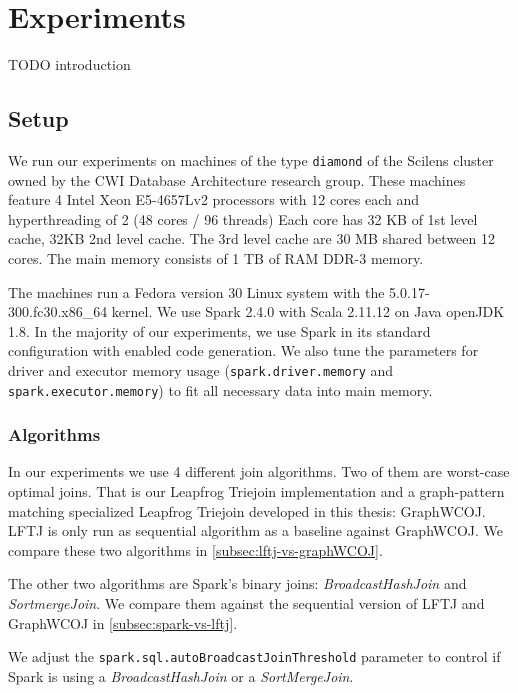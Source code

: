 \section{Experiments}\label{sec:experiments}

TODO introduction

\subsection{Setup} \label{subsec:experimental-setup}

We run our experiments on machines of the type \texttt{diamond} of the Scilens cluster owned by the CWI Database Architecture research
group.
These machines feature 4 Intel Xeon E5-4657Lv2 processors with 12 cores each and hyperthreading of 2 (48 cores / 96 threads)
Each core has 32 KB of 1st level cache, 32KB 2nd level cache.
The 3rd level cache are 30 MB shared between 12 cores.
The main memory consists of 1 TB of RAM DDR-3 memory.

The machines run a Fedora version 30 Linux system with the 5.0.17-300.fc30.x86\_64 kernel.
We use Spark 2.4.0 with Scala 2.11.12 on Java openJDK 1.8.
In the majority of our experiments, we use Spark in its standard configuration with enabled code generation.
We also tune the parameters for driver and executor memory usage (\texttt{spark.driver.memory} and \texttt{spark.executor.memory}) to fit
all necessary data into main memory.

\subsubsection{Algorithms}

In our experiments we use 4 different join algorithms.
Two of them are worst-case optimal joins.
That is our Leapfrog Triejoin implementation and a graph-pattern matching
specialized Leapfrog Triejoin developed in this thesis: Graph\textsc{WCOJ}.
LFTJ is only run as sequential algorithm as a baseline against GraphWCOJ.
We compare these two algorithms in \cref{subsec:lftj-vs-graphWCOJ}.

The other two algorithms are Spark's binary joins: \textit{BroadcastHashJoin} and \textit{SortmergeJoin}.
We compare them against the sequential version of \textsc{LFTJ} and GraphWCOJ in \cref{subsec:spark-vs-lftj}.

We adjust the \texttt{spark.sql.autoBroadcastJoinThreshold} parameter to control
if Spark is using a \textit{BroadcastHashJoin} or a \textit{SortMergeJoin}.

